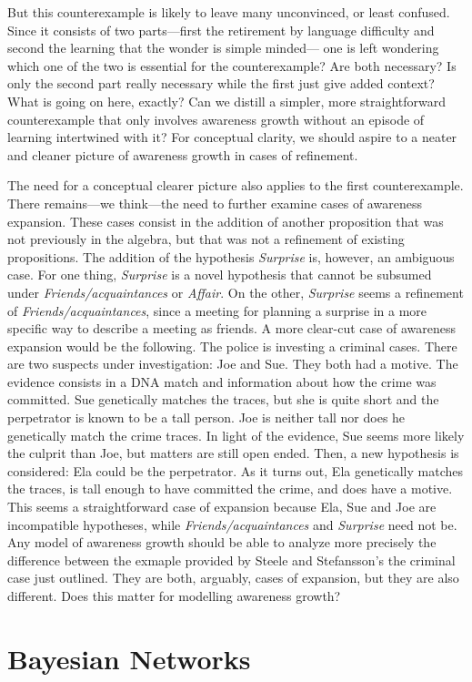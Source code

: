 \documentclass[
  11pt,
  dvipsnames,enabledeprecatedfontcommands]{scrartcl}
\begin{document}
But this counterexample is likely to leave many unconvinced, or least
confused. Since it consists of two parts---first the retirement by
language difficulty and second the learning that the wonder is simple
minded--- one is left wondering which one of the two is essential for
the counterexample? Are both necessary? Is only the second part really
necessary while the first just give added context? What is going on
here, exactly? Can we distill a simpler, more straightforward
counterexample that only involves awareness growth without an episode of
learning intertwined with it? For conceptual clarity, we should aspire
to a neater and cleaner picture of awareness growth in cases of
refinement.

The need for a conceptual clearer picture also applies to the first
counterexample. There remains---we think---the need to further examine
cases of awareness expansion. These cases consist in the addition of
another proposition that was not previously in the algebra, but that was
not a refinement of existing propositions. The addition of the
hypothesis \textit{Surprise} is, however, an ambiguous case. For one
thing, \textit{Surprise} is a novel hypothesis that cannot be subsumed
under \textit{Friends/acquaintances} or \textit{Affair}. On the other,
\textit{Surprise} seems a refinement of \textit{Friends/acquaintances},
since a meeting for planning a surprise in a more specific way to
describe a meeting as friends. A more clear-cut case of awareness
expansion would be the following. The police is investing a criminal
cases. There are two suspects under investigation: Joe and Sue. They
both had a motive. The evidence consists in a DNA match and information
about how the crime was committed. Sue genetically matches the traces,
but she is quite short and the perpetrator is known to be a tall person.
Joe is neither tall nor does he genetically match the crime traces. In
light of the evidence, Sue seems more likely the culprit than Joe, but
matters are still open ended. Then, a new hypothesis is considered: Ela
could be the perpetrator. As it turns out, Ela genetically matches the
traces, is tall enough to have committed the crime, and does have a
motive. This seems a straightforward case of expansion because Ela, Sue
and Joe are incompatible hypotheses, while
\textit{Friends/acquaintances} and \textit{Surprise} need not be. Any
model of awareness growth should be able to analyze more precisely the
difference between the exmaple provided by Steele and Stefansson's the
criminal case just outlined. They are both, arguably, cases of
expansion, but they are also different. Does this matter for modelling
awareness growth?

\hypertarget{bayesian-networks}{%
\section{Bayesian Networks}\label{bayesian-networks}}
\end{document}
